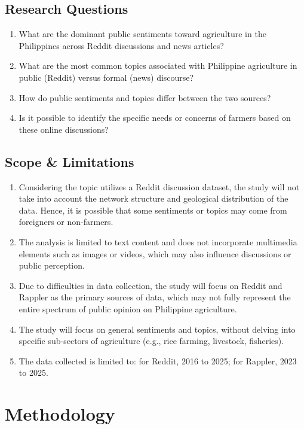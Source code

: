 \documentclass[conference]{IEEEtran}
\begin{document}
\subsection{Research Questions}
    \begin{enumerate}
        \item What are the dominant public sentiments toward agriculture in the Philippines across Reddit discussions and news articles?
        \item What are the most common topics associated with Philippine agriculture in public (Reddit) versus formal (news) discourse?
        \item How do public sentiments and topics differ between the two sources?
        \item Is it possible to identify the specific needs or concerns of farmers based on these online discussions?
    \end{enumerate}

\subsection{Scope \& Limitations}
    \begin{enumerate}
        \item Considering the topic utilizes a Reddit discussion dataset, the study will not take into account the network structure and geological distribution of the data. Hence, it is possible that some sentiments or topics may come from foreigners or non-farmers.
        \item The analysis is limited to text content and does not incorporate multimedia elements such as images or videos, which may also influence discussions or public perception.
        \item Due to difficulties in data collection, the study will focus on Reddit and Rappler as the primary sources of data, which may not fully represent the entire spectrum of public opinion on Philippine agriculture.
        \item The study will focus on general sentiments and topics, without delving into specific sub-sectors of agriculture (e.g., rice farming, livestock, fisheries).
        \item The data collected is limited to: for Reddit, 2016 to 2025; for Rappler, 2023 to 2025.
    \end{enumerate}

\section{Methodology}
\end{document}

